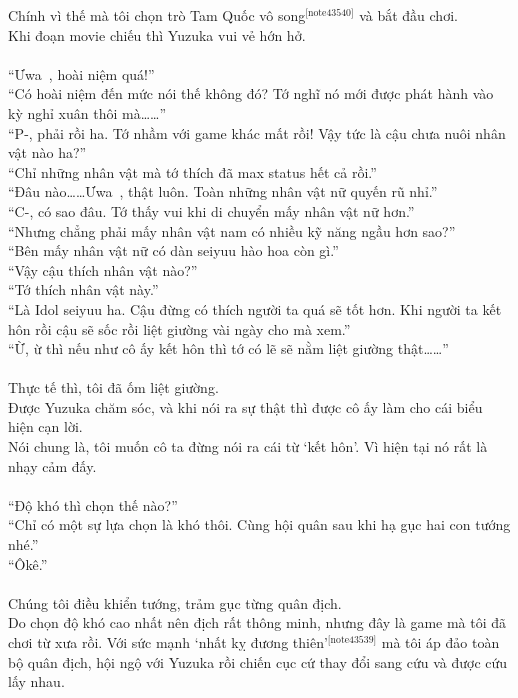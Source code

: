 \documentclass[12pt,a4paper, twosides]{book}
\begin{document}
Chính vì thế mà tôi chọn trò Tam Quốc vô song$^\text{[note43540]}$ và bắt đầu chơi.\\
Khi đoạn movie chiếu thì Yuzuka vui vẻ hớn hở.\\
\\
“Ưwa~, hoài niệm quá!”\\
“Có hoài niệm đến mức nói thế không đó? Tớ nghĩ nó mới được phát hành vào kỳ nghỉ xuân thôi mà……”\\
“P-, phải rồi ha. Tớ nhầm với game khác mất rồi! Vậy tức là cậu chưa nuôi nhân vật nào ha?”\\
“Chỉ những nhân vật mà tớ thích đã max status hết cả rồi.”\\
“Đâu nào……Ưwa~, thật luôn. Toàn những nhân vật nữ quyến rũ nhỉ.”\\
“C-, có sao đâu. Tớ thấy vui khi di chuyển mấy nhân vật nữ hơn.”\\
“Nhưng chẳng phải mấy nhân vật nam có nhiều kỹ năng ngầu hơn sao?”\\
“Bên mấy nhân vật nữ có dàn seiyuu hào hoa còn gì.”\\
“Vậy cậu thích nhân vật nào?”\\
“Tớ thích nhân vật này.”\\
“Là Idol seiyuu ha. Cậu đừng có thích người ta quá sẽ tốt hơn. Khi người ta kết hôn rồi cậu sẽ sốc rồi liệt giường vài ngày cho mà xem.”\\
“Ừ, ừ thì nếu như cô ấy kết hôn thì tớ có lẽ sẽ nằm liệt giường thật……”\\
\\
Thực tế thì, tôi đã ốm liệt giường.\\
Được Yuzuka chăm sóc, và khi nói ra sự thật thì được cô ấy làm cho cái biểu hiện cạn lời.\\
Nói chung là, tôi muốn cô ta đừng nói ra cái từ ‘kết hôn’. Vì hiện tại nó rất là nhạy cảm đấy.\\
\\
“Độ khó thì chọn thế nào?”\\
“Chỉ có một sự lựa chọn là khó thôi. Cùng hội quân sau khi hạ gục hai con tướng nhé.”\\
“Ôkê.”\\
\\
Chúng tôi điều khiển tướng, trảm gục từng quân địch.\\
Do chọn độ khó cao nhất nên địch rất thông minh, nhưng đây là game mà tôi đã chơi từ xưa rồi. Với sức mạnh ‘nhất kỵ đương thiên’$^\text{[note43539]}$ mà tôi áp đảo toàn bộ quân địch, hội ngộ với Yuzuka rồi chiến cục cứ thay đổi sang cứu và được cứu lấy nhau.\\
\end{document}

